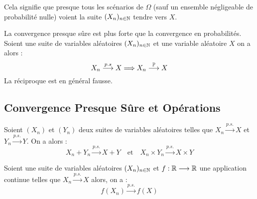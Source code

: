 Cela signifie que presque tous les scénarios de $\Omega$ (sauf un ensemble négligeable de probabilité nulle)
voient la suite $(X_n)_{n \in \mathbb{N}}$ tendre vers $X$. 

\begin{prop}[Comparaison]
    La convergence presque sûre est plus forte que la convergence en probabilités. 
    Soient une suite de variables aléatoires $(X_n)_{n \in \mathbb{N}}$ et une variable aléatoire $X$ on a alors : 
        \[ X_n \overset{p.s}{\longrightarrow} X \Longrightarrow X_n \overset{\mathbb{P}}{\longrightarrow} X \] 
    La réciproque est en général fausse. 
\end{prop}


\subsection{Convergence Presque Sûre et Opérations}

\begin{prop}
    Soient $(X_n)$ et $(Y_n)$ deux suites de variables aléatoires telles que $X_n \overset{p.s.}{\longrightarrow} X$ 
    et $Y_n \overset{p.s.}{\longrightarrow} Y$. On a alors : 
        \[ X_n + Y_n \overset{p.s.}{\longrightarrow} X + Y \quad \text{et} \quad X_n \times Y_n \overset{p.s.}{\longrightarrow} X \times Y \]
\end{prop}

\begin{prop}
    Soient une suite de variables aléatoires $(X_n)_{n \in \mathbb{N}}$ et $f : \mathbb{R} \longrightarrow \mathbb{R}$ une application 
    continue telles que $X_n \overset{p.s.}{\longrightarrow} X$ alors, on a : 
        \[ f(X_n) \overset{p.s.}{\longrightarrow} f(X) \] 
\end{prop}